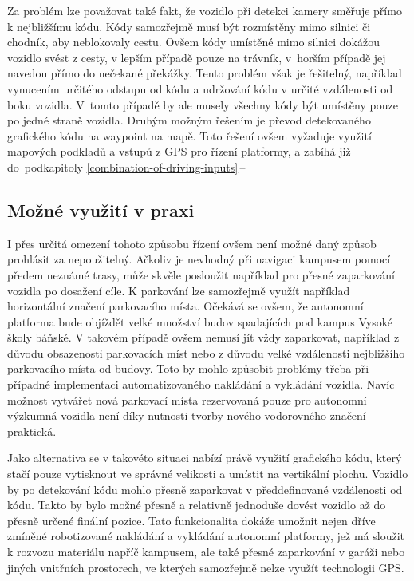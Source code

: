 \documentclass[czech, bachelor]{diploma}
\newcommand{\peteref}[1]{\ref{#1}\,--\,\nameref{#1}}
\begin{document}
Za problém lze považovat také fakt, že vozidlo při detekci kamery směřuje přímo k nejbližšímu kódu. Kódy samozřejmě musí být
rozmístěny mimo silnici či chodník, aby neblokovaly cestu. Ovšem kódy umístěné mimo silnici dokážou vozidlo svést z cesty,
v lepším případě pouze na trávník, v~horším případě jej navedou přímo do nečekané překážky. Tento problém však je řešitelný,
například vynucením určitého odstupu od kódu a udržování kódu v určité vzdálenosti od boku vozidla.  V~tomto případě by ale musely
všechny kódy být umístěny pouze po jedné straně vozidla. Druhým možným řešením je převod detekovaného grafického kódu na waypoint
na mapě. Toto řešení ovšem vyžaduje využití mapových podkladů a vstupů z GPS pro řízení platformy, a zabíhá již do~podkapitoly
\peteref{combination-of-driving-inputs}

\subsection{Možné využití v praxi}

I přes určitá omezení tohoto způsobu řízení ovšem není možné daný způsob prohlásit za nepoužitelný. Ačkoliv je nevhodný
při navigaci kampusem pomocí předem neznámé trasy, může skvěle posloužit například pro přesné zaparkování vozidla po dosažení
cíle. K parkování lze samozřejmě využít například horizontální značení parkovacího místa. Očekává se ovšem, že autonomní platforma
bude objíždět velké množství budov spadajících pod kampus Vysoké školy báňské. V takovém případě ovšem nemusí jít vždy zaparkovat,
například z důvodu obsazenosti parkovacích míst nebo z důvodu velké vzdálenosti nejbližšího parkovacího místa od budovy. Toto by
mohlo způsobit problémy třeba při případné implementaci automatizovaného nakládání a vykládání vozidla. Navíc možnost vytvářet
nová parkovací místa rezervovaná pouze pro autonomní výzkumná vozidla není díky nutnosti tvorby nového vodorovného značení
praktická.

Jako alternativa se v takovéto situaci nabízí právě využití grafického kódu, který stačí pouze vytisknout ve správné velikosti
a umístit na vertikální plochu. Vozidlo by po detekování kódu mohlo přesně zaparkovat v předdefinované vzdálenosti od kódu. Takto
by bylo možné přesně a relativně jednoduše dovést vozidlo až do přesně určené finální pozice. Tato funkcionalita dokáže umožnit
nejen dříve zmíněné robotizované nakládání a vykládání autonomní platformy, jež má sloužit k rozvozu materiálu napříč kampusem,
ale také přesné zaparkování v garáži nebo jiných vnitřních prostorech, ve kterých samozřejmě nelze využít technologii GPS.
\end{document}
